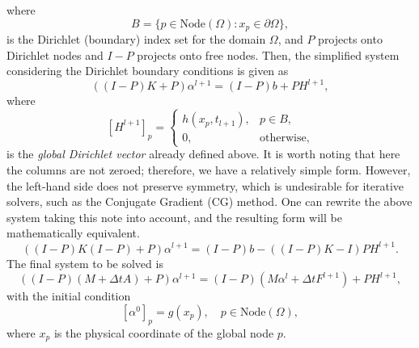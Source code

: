 \documentclass[a4paper, 11pt]{article}
\theoremstyle{plain}
\theoremstyle{definition}
\theoremstyle{remark}
\begin{document}
where 
\begin{equation*}
    B = \{p\in \text{Node}(\Omega): x_p\in \partial \Omega\},
\end{equation*}
is the Dirichlet (boundary) index set for the domain $\Omega$, and $P$ projects onto Dirichlet nodes and $I - P$ projects onto free nodes. Then, the simplified system considering the Dirichlet boundary conditions is given as
\begin{equation*}
    \left(\left(I - P\right)K + P\right)\alpha^{l+1} = \left(I - P\right)b + PH^{l+1},
\end{equation*}
where 
\begin{equation*}
    \left[H^{l+1}\right]_{p} = 
    \begin{cases}
        h(x_{p}, t_{l+1}), & p\in B,\\
        0, & \text{otherwise},
    \end{cases}
\end{equation*}
is the \textit{global Dirichlet vector} already defined above. It is worth noting that here the columns are not zeroed; therefore, we have a relatively simple form. However, the left-hand side does not preserve symmetry, which is undesirable for iterative solvers, such as the Conjugate Gradient (CG) method. One can rewrite the above system taking this note into account, and the resulting form will be mathematically equivalent.
\begin{equation*}
    \left(\left(I - P\right)K\left(I - P\right) + P\right)\alpha^{l+1} = \left(I - P\right)b - \left((I - P)K - I\right)PH^{l+1}.
\end{equation*}
The final system to be solved is 
\begin{equation*}
    \left(\left(I - P\right)\left(M + \Delta t A\right) + P\right)\alpha^{l+1} = \left(I - P\right)\left(M \alpha^{l} + \Delta tF^{l+1}\right) + PH^{l+1},
\end{equation*}
with the initial condition
\begin{equation*}
    \left[\alpha^{0}\right]_{p} = g(x_{p}), \quad p\in \text{Node}(\Omega),
\end{equation*}
where $x_p$ is the physical coordinate of the global node $p$. \vspace{10pt}
\end{document}
